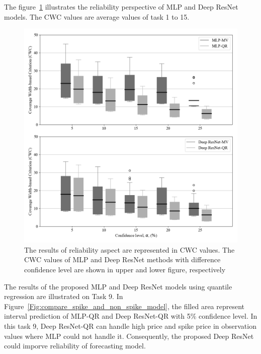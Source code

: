 \documentclass[review]{elsarticle}
\begin{document}
    The figure~\ref{Fig:CWC} illustrates the reliability perspective of MLP and Deep ResNet models. The CWC values are average values of task 1 to 15.
    \begin{figure}[H]
      \centering
      \includegraphics[width=12cm]{boxcompare_MV-QR}
      \caption{The results of reliability aspect are represented in CWC values. The CWC values of MLP and Deep ResNet methods with difference confidence level are shown in upper and lower figure, respectively}
      \label{Fig:CWC}
    \end{figure}
    The results of the proposed MLP and Deep ResNet models using quantile regression are illustrated on Task 9. In Figure~\ref{Fig:compare_spike_and_non_spike_model}, the filled area represent interval prediction of MLP-QR and Deep ResNet-QR with 5$\%$ confidence level. In this task 9, Deep ResNet-QR can handle high price and spike price in observation values where MLP could not handle it. Consequently, the proposed Deep ResNet could imporve reliability of forecasting model.
\end{document}
